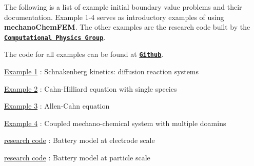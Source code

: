 The following is a list of example initial boundary value problems and their documentation. Example 1-\/4 serves as introductory examples of using {\bfseries mechano\-Chem\-F\-E\-M}. The other examples are the research code built by the \href{http://umich.edu/~compphys/index.html}{\tt {\bfseries Computational Physics Group}}.

The code for all examples can be found at \href{https://github.com/mechanoChem/mechanoChemFEM/tree/example}{\tt {\bfseries Github}}.

\hyperlink{diffusion_reaction}{Example 1} \-: Schnakenberg kinetics\-: diffusion reaction systems \par
 \hyperlink{_cahn_hilliard}{Example 2} \-: Cahn-\/\-Hilliard equation with single species\par
 \hyperlink{_allen__cahn}{Example 3} \-: Allen-\/\-Cahn equation \par
 \hyperlink{growth}{Example 4} \-: Coupled mechano-\/chemical system with multiple doamins\par




\hyperlink{battery_electrode_scale}{research code} \-: Battery model at electrode scale\par
 \hyperlink{battery_particle}{research code} \-: Battery model at particle scale\par
